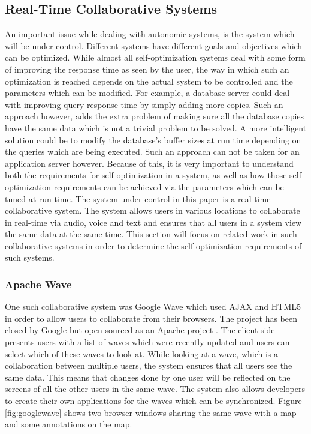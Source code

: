 {\subsection{Real-Time Collaborative Systems}

An important issue while dealing with autonomic systems, is the system which will be under control. Different systems have different goals and objectives which can be optimized. While almost all self-optimization systems deal with some form of improving the response time as seen by the user, the way in which such an optimization is reached depends on the actual system to be controlled and the parameters which can be modified. For example, a database server could deal with improving query response time by simply adding more copies. Such an approach however, adds the extra problem of making sure all the database copies have the same data which is not a trivial problem to be solved. A more intelligent solution could be to modify the database's buffer sizes at run time depending on the queries which are being executed. Such an approach can not be taken for an application server however. Because of this, it is very important to understand both the requirements for self-optimization in a system, as well as how those self-optimization requirements can be achieved via the parameters which can be tuned at run time. The system under control in this paper is a real-time collaborative system. The system allows users in various locations to collaborate in real-time via audio, voice and text and ensures that all users in a system view the same data at the same time. This section will focus on related work in such collaborative systems in order to determine the self-optimization requirements of such systems.

\subsubsection{Apache Wave}

One such collaborative system was Google Wave which used AJAX and HTML5 in order to allow users to collaborate from their browsers. The project has been closed by Google but open sourced as an Apache project \cite{product:wave}. The client side presents users with a list of waves which were recently updated and users can select which of these waves to look at. While looking at a wave, which is a collaboration between multiple users, the system ensures that all users see the same data. This means that changes done by one user will be reflected on the screens of all the other users in the same wave. The system also allows developers to create their own applications for the waves which can be synchronized. Figure \ref{fig:googlewave} shows two browser windows sharing the same wave with a map and some annotations on the map.

}
